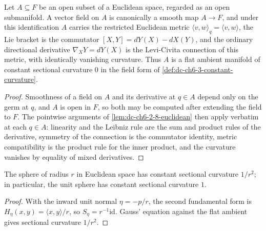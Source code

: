 \begin{lemma}
  \label{lem:dc-ch6-2-8-euclidean-opens}
  \leanok
  Let $A\subseteq F$ be an open subset of a Euclidean space, regarded as an
  open submanifold. A vector field on $A$ is canonically a smooth map
  $A\to F$, and under this identification $A$ carries the restricted Euclidean
  metric $\langle v,w\rangle_q=\langle v,w\rangle$, the Lie bracket is the
  commutator $[X,Y]=dY(X)-dX(Y)$, and the ordinary directional derivative
  $\nabla_XY=dY(X)$ is the Levi-Civita connection of this metric, with
  identically vanishing curvature. Thus $A$ is a flat ambient manifold of
  constant sectional curvature $0$ in the field form of
  \cref{def:dc-ch6-3-constant-curvature}.
\end{lemma}
\begin{proof}
  \leanok
  \sketch
  Smoothness of a field on $A$ and its derivative at $q\in A$ depend only on
  the germ at $q$, and $A$ is open in $F$, so both may be computed after
  extending the field to $F$. The pointwise arguments of
  \cref{lem:dc-ch6-2-8-euclidean} then apply verbatim at each $q\in A$:
  linearity and the Leibniz rule are the sum and product rules of the
  derivative, symmetry of the connection is the commutator identity, metric
  compatibility is the product rule for the inner product, and the curvature
  vanishes by equality of mixed derivatives.
\end{proof}

\begin{example}[curvature of $S^n$]
  \label{ex:dc-ch6-2-8}
  \leanok
  The sphere of radius $r$ in Euclidean space has constant sectional curvature
  $1/r^2$; in particular, the unit sphere has constant sectional curvature $1$.
\end{example}
\begin{proof}
  \sketch
  With the inward unit normal $\eta=-p/r$, the second fundamental form is
  $H_\eta(x,y)=\langle x,y\rangle/r$, so $S_\eta=r^{-1}\mathrm{id}$. Gauss'
  equation against the flat ambient gives sectional curvature $1/r^2$.
\end{proof}

